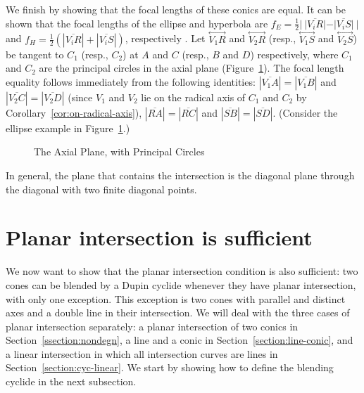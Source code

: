 We finish by showing that the focal lengths of these conics
are equal.
It can be shown that the focal lengths of the ellipse and hyperbola are
$f_E=\frac{1}{2}|\ |\overline{V_iR}|-|\overline{V_iS}|\ |$ and
$f_H=\frac{1}{2}(|\overline{V_iR}|+|\overline{V_iS}|)$, respectively
\cite[Lemma~4.1]{shenethesis}.
Let $\stackrel{\longleftrightarrow}{V_1R}$ and
$\stackrel{\longleftrightarrow}{V_2R}$ (resp.,
$\stackrel{\longleftrightarrow}{V_1S}$ and
$\stackrel{\longleftrightarrow}{V_2S}$) be tangent to $C_1$ (resp., $C_2$) at
$A$ and $C$ (resp., $B$ and $D$) respectively, where $C_1$ and $C_2$ are the 
principal circles in the axial plane (Figure~\ref{fig:Q-RS}). 
The focal length equality follows immediately from the following identities:
$|\overline{V_1A}|=|\overline{V_1B}|$ and 
$|\overline{V_2C}|=|\overline{V_2D}|$ (since $V_1$ and $V_2$ lie on the radical
axis of $C_1$ and $C_2$ by Corollary~\ref{cor:on-radical-axis}),
$|\overline{RA}|=|\overline{RC}|$ and $|\overline{SB}|=|\overline{SD}|$.
(Consider the ellipse example in Figure~\ref{fig:Q-RS}.)
\QED

\begin{figure}
\vspace{7cm}
\caption{The Axial Plane, with Principal Circles}
\label{fig:Q-RS}
\end{figure}

\begin{cor}
In general,
the plane that contains the intersection
is the diagonal plane through the diagonal with two finite diagonal points.
\end{cor}

\section{Planar intersection is sufficient}
\label{section:cyclide-non-degen}

We now want to show that the planar intersection condition is also sufficient:
two cones can be blended by a Dupin cyclide whenever
they have planar intersection, with only one exception.
This exception is
two cones with parallel and distinct axes and a double line in their intersection.
We will deal with the three cases of planar intersection separately:
a planar intersection of two conics in Section~\ref{ssection:nondegn}, 
a line and a conic in Section~\ref{section:line-conic}, 
and a linear intersection in which all 
intersection curves are lines in Section~\ref{section:cyc-linear}.
We start by showing how to define the blending cyclide in the next subsection.

